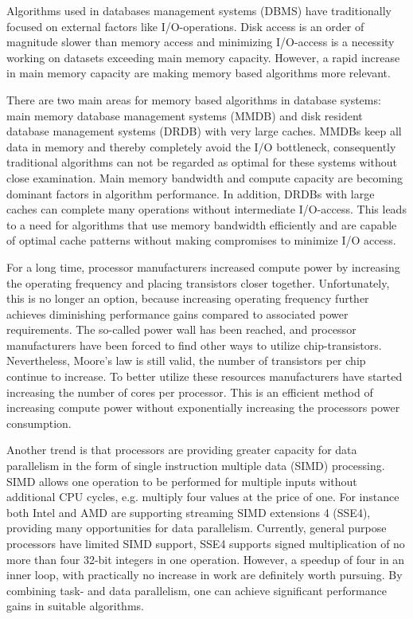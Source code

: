 \documentclass[12pt,a4paper,twoside]{report}
\begin{document}
Algorithms used in databases management systems (DBMS) have
traditionally focused on external factors like I/O-operations. Disk
access is an order of magnitude slower than memory access and
minimizing I/O-access is a necessity working on datasets exceeding
main memory capacity. However, a rapid increase in main memory
capacity are making memory based algorithms more relevant.

There are two main areas for memory based algorithms in database
systems: main memory database management systems (MMDB) and disk
resident database management systems (DRDB) with very large caches.
MMDBs keep all data in memory and thereby completely avoid the I/O
bottleneck, consequently traditional algorithms can not be regarded as
optimal for these systems without close examination. Main memory
bandwidth and compute capacity are becoming dominant factors in
algorithm performance. In addition, DRDBs with large caches can
complete many operations without intermediate I/O-access. This leads
to a need for algorithms that use memory bandwidth efficiently and are
capable of optimal cache patterns without making compromises to
minimize I/O access.

For a long time, processor manufacturers increased compute power by
increasing the operating frequency and placing transistors closer
together. Unfortunately, this is no longer an option, because
increasing operating frequency further achieves diminishing
performance gains compared to associated power requirements. The
so-called power wall has been reached, and processor manufacturers
have been forced to find other ways to utilize chip-transistors.
Nevertheless, Moore's law is still valid, the number of transistors
per chip continue to increase. To better utilize these resources
manufacturers have started increasing the number of cores per
processor. This is an efficient method of increasing compute power
without exponentially increasing the processors power consumption.

Another trend is that processors are providing greater capacity for
data parallelism in the form of single instruction multiple data
(SIMD) processing. SIMD allows one operation to be performed for
multiple inputs without additional CPU cycles, e.g. multiply four
values at the price of one. For instance both Intel and AMD are
supporting streaming SIMD extensions 4 (SSE4), providing many
opportunities for data parallelism. Currently, general purpose
processors have limited SIMD support, SSE4 supports signed
multiplication of no more than four 32-bit integers in one operation.
However, a speedup of four in an inner loop, with practically no
increase in work are definitely worth pursuing. By combining task- and
data parallelism, one can achieve significant performance gains in
suitable algorithms. 
\end{document}

